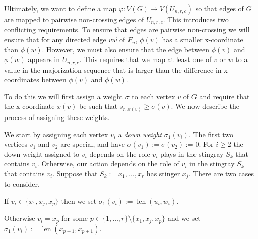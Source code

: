 \documentclass{patmorin}
\newcommand{\defin}[1]{\emph{\color{brightmaroon}#1}}
\DeclareMathOperator{\len}{len}
\begin{document}
Ultimately, we want to define a map $\varphi:V(G)\to V(U_{n,r,c})$ so that edges of $G$ are mapped to pairwise non-crossing edges of $U_{n,r,c}$.  This introduces two conflicting requirements. To ensure that edges are pairwise non-crossing we will ensure that for any directed edge $\overrightarrow{vw}$ of $F_n$, $\phi(v)$ has a smaller x-coordinate than $\phi(w)$.   However, we must also ensure that the edge between $\phi(v)$ and $\phi(w)$ appears in $U_{n,r,c}$. This requires that we map at least one of $v$ or $w$ to a value in the majorization sequence that is larger than the difference in x-coordinates between $\phi(v)$ and $\phi(w)$.

To do this we will first assign a weight $\sigma$ to each vertex $v$ of $G$ and require that the x-coordinate $x(v)$ be such that $s_{r,x(v)} \ge \sigma(v)$.  We now describe the process of assigning these weights.

We start by assigning each vertex $v_i$ a \defin{down weight} $\sigma_1(v_i)$. The first two vertices $v_1$ and $v_2$ are special, and have $\sigma(v_1):=\sigma(v_2):=0$.  For $i\ge 2$ the down weight assigned to $v_i$ depends on the role $v_i$ plays in the stingray $S_k$ that contains $v_i$.  Otherwise, our action depends on the role of $v_i$ in the stingray $S_k$ that contains $v_i$.  Suppose that $S_k:=x_1,\ldots,x_r$ has stinger $x_j$.  There are two cases to consider.
\begin{compactenum}
  \item If $v_i\in\{x_1,x_j,x_p\}$ then we set $\sigma_1(v_i):=\len(u_i,w_i)$.

  \item Otherwise $v_i=x_p$ for some $p\in\{1,\ldots,r\}\setminus\{x_1,x_j,x_p\}$ and we set $\sigma_1(v_i):=\len(x_{p-1},x_{p+1})$.
\end{compactenum}
\end{document}
